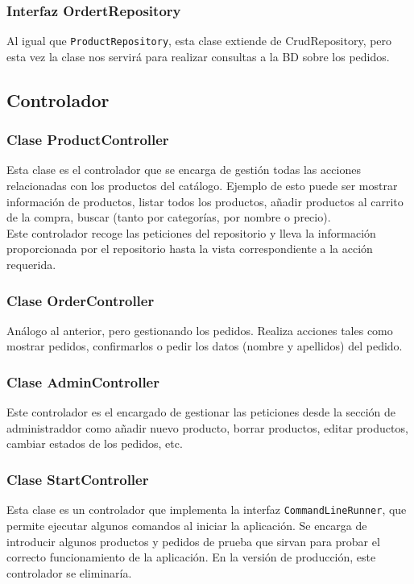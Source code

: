 \documentclass[12pt,a4paper,svgnames]{article}
\begin{document}
\subsubsection{Interfaz OrdertRepository}
Al igual que \texttt{ProductRepository}, esta clase extiende de CrudRepository, pero esta vez la clase nos servirá para realizar consultas a la BD sobre los pedidos.\\
\subsection{Controlador}
\subsubsection{Clase ProductController}
Esta clase es el controlador que se encarga de gestión todas las acciones relacionadas con los productos del catálogo. Ejemplo de esto puede ser mostrar información de productos, listar todos los productos, añadir productos al carrito de la compra, buscar (tanto por categorías, por nombre o precio). \\

Este controlador recoge las peticiones del repositorio y lleva la información proporcionada por el repositorio hasta la vista correspondiente a la acción requerida.

\subsubsection{Clase OrderController}
Análogo al anterior, pero gestionando los pedidos. Realiza acciones tales como mostrar pedidos, confirmarlos o pedir los datos (nombre y apellidos) del pedido.

\subsubsection{Clase AdminController}
Este controlador es el encargado de gestionar las peticiones desde la sección de administraddor como añadir nuevo producto, borrar productos, editar productos, cambiar estados de los pedidos, etc.

\subsubsection{Clase StartController}
Esta clase es un controlador que implementa la interfaz \texttt{CommandLineRunner}, que permite ejecutar algunos comandos al iniciar la aplicación. Se encarga de introducir algunos productos y pedidos de prueba que sirvan para probar el correcto funcionamiento de la aplicación. En la versión de producción, este controlador se eliminaría.
\end{document}
